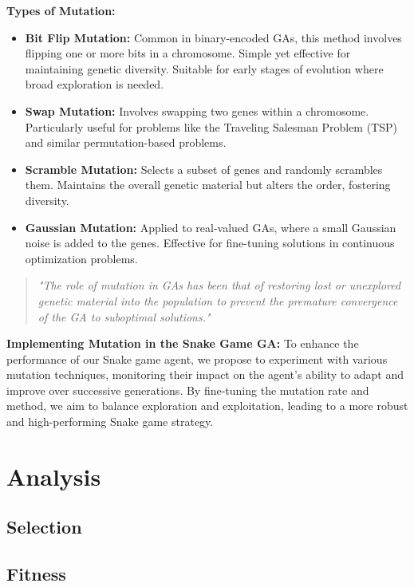 \documentclass[a4paper, twocolumn]{article}
\begin{document}
\textbf{Types of Mutation:}
\begin{itemize}
    \item \textbf{Bit Flip Mutation:} Common in binary-encoded GAs, this method involves flipping one or more bits in a chromosome. Simple yet effective for maintaining genetic diversity. Suitable for early stages of evolution where broad exploration is needed.
    \item \textbf{Swap Mutation:} Involves swapping two genes within a chromosome. Particularly useful for problems like the Traveling Salesman Problem (TSP) and similar permutation-based problems.
    \item \textbf{Scramble Mutation:} Selects a subset of genes and randomly scrambles them. Maintains the overall genetic material but alters the order, fostering diversity.
    \item \textbf{Gaussian Mutation:} Applied to real-valued GAs, where a small Gaussian noise is added to the genes. Effective for fine-tuning solutions in continuous optimization problems.
\end{itemize}

\begin{quote}
\emph{"The role of mutation in GAs has been that of restoring lost or unexplored genetic material into the population to prevent the premature convergence of the GA to suboptimal solutions."} \cite{srinvas1994adaptive}
\end{quote}

\textbf{Implementing Mutation in the Snake Game GA:} To enhance the performance of our Snake game agent, we propose to experiment with various mutation techniques, monitoring their impact on the agent's ability to adapt and improve over successive generations. By fine-tuning the mutation rate and method, we aim to balance exploration and exploitation, leading to a more robust and high-performing Snake game strategy.




\section{Analysis\label{sec:Analysis}}
\subsection{Selection\label{sec:Selection}}
\subsection{Fitness\label{sec:Fitness}}
\end{document}
